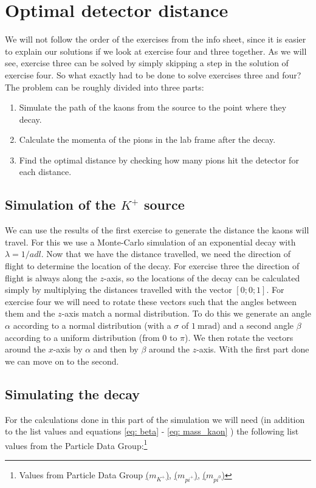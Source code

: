 \documentclass[12pt,a4paper,oneside,english]{article}
\begin{document}
\section{Optimal detector distance}
	We will not follow the order of the exercises from the info sheet, since it is easier to explain our solutions if we look at exercise four and three together. As we will see, exercise three can be solved by simply skipping a step in the solution of exercise four. So what exactly had to be done to solve exercises three and four? The problem can be roughly divided into three parts:
	\begin{enumerate}
	\item Simulate the path of the kaons from the source to the point where they decay.
	\item Calculate the momenta of the pions in the lab frame after the decay.
	\item Find the optimal distance by checking how many pions hit the detector for each distance.
	\end{enumerate}
	
	\subsection{Simulation of the $K^+$ source}
	We can use the results of the first exercise to generate the distance the kaons will travel. For this we use a Monte-Carlo simulation of an exponential decay with $\lambda = 1/adl$. Now that we have the distance travelled, we need the direction of flight to determine the location of the decay. For exercise three the direction of flight is always along the $z$-axis, so the locations of the decay can be calculated simply by multiplying the distances travelled with the vector $[0;0;1]$. For exercise four we will need to rotate these vectors such that the angles between them and the $z$-axis match a normal distribution. To do this we generate an angle $\alpha$ according to a normal distribution (with a $\sigma$ of $\SI{1}{\milli\radian}$) and a second angle $\beta$ according to a uniform distribution (from $0$ to $\pi$). We then rotate the vectors around the $x$-axis by $\alpha$ and then by $\beta$ around the $z$-axis.
	With the first part done we can move on to the second.

	\subsection{Simulating the decay}
	For the calculations done in this part of the simulation we will need (in addition to the list values and equations \ref{eq: beta} - \ref{eq: mass_kaon} ) the following list values
	from the Particle Data Group:\footnote{Values from Particle Data Group \href{http://pdg.lbl.gov/2017/listings/rpp2017-list-K-plus-minus.pdf}{($m_{K^+}$)}, \href{http://pdg.lbl.gov/2017/listings/rpp2017-list-pi-plus-minus.pdf}{($m_{pi^+ }$)}, \href{http://pdg.lbl.gov/2017/listings/rpp2017-list-pi-zero.pdf}{($m_{pi^0 }$)}} 
	
\end{document}
